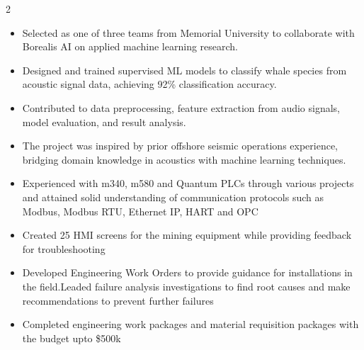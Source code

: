 \documentclass[10pt,a4paper,ragged2e,withhyper]{altacv}
\begin{document}
\begin{paracol}{2}
\begin{itemize}
\end{itemize}

\divider
{}
\begin{itemize}
\item Selected as one of three teams from Memorial University to collaborate with Borealis AI on applied machine learning research.
\item Designed and trained supervised ML models to classify whale species from acoustic signal data, achieving 92\% classification accuracy.
\item Contributed to data preprocessing, feature extraction from audio signals, model evaluation, and result analysis.
\item The project was inspired by prior offshore seismic operations experience, bridging domain knowledge in acoustics with machine learning techniques.
\end{itemize}
{}
\begin{itemize}
\item Experienced with m340, m580 and Quantum PLCs through various
projects and attained solid understanding of communication protocols
such as Modbus, Modbus RTU, Ethernet IP, HART and OPC
\item Created 25 HMI screens for the mining equipment while providing feedback for troubleshooting 
\item Developed Engineering Work Orders to provide guidance for installations in the field.Leaded failure analysis investigations to find root causes and make recommendations to prevent further failures
\end{itemize}

\divider

\begin{itemize}
\item Completed engineering work packages and material requisition packages with the budget upto \$500k
 


\end{itemize}
\end{paracol}
\end{document}
